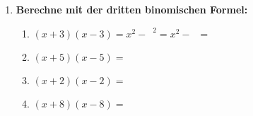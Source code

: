 \begin{enumerate}[label=\arabic*., resume]
    \vspace{1cm}

    \item \textbf{Berechne mit der dritten binomischen Formel:}

    \vspace{0.5cm}

    \begin{enumerate}[label=\alph*)]
        \item $(x + 3)(x - 3) = x^2 - \phantom{0}^2 = x^2 - \phantom{0}$ = \underline{\hspace{3cm}}
        \vspace{0.5cm}
        \item $(x + 5)(x - 5) = $ \underline{\hspace{6cm}}
        \vspace{0.5cm}
        \item $(x + 2)(x - 2) = $ \underline{\hspace{6cm}}
        \vspace{0.5cm}
        \item $(x + 8)(x - 8) = $ \underline{\hspace{6cm}}
    \end{enumerate}

\end{enumerate}